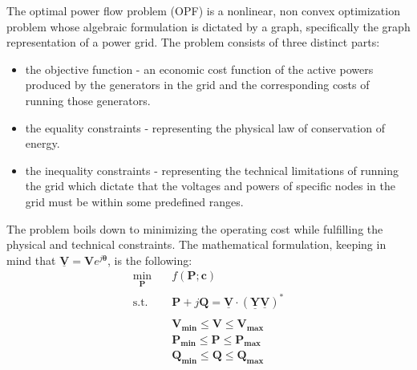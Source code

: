 The optimal power flow problem (OPF) is a nonlinear, non convex optimization problem\cite{cain2012history, bienstock2019strong} whose algebraic formulation is dictated by a graph,
specifically the graph representation of a power grid.
The problem consists of three distinct parts:

\begin{itemize}
    \item the objective function - an economic cost function of the active powers produced by the generators in
    the grid and the corresponding costs of running those generators.

    \item the equality constraints - representing the physical law of conservation of energy.

    \item the inequality constraints - representing the technical limitations of running the grid which dictate that
    the voltages and powers of specific nodes in the grid must be within some predefined ranges.
\end{itemize}

\noindent The problem boils down to minimizing the operating cost while fulfilling the physical and technical constraints.
The mathematical formulation, keeping in mind that $\boldsymbol{\underline{V}} = \boldsymbol{V}e^{j\boldsymbol{\theta}}$, is the following:
\begin{equation}
    \begin{aligned}
        \min_{\boldsymbol{P}} \quad & f(\boldsymbol{P}; \boldsymbol{c})\\%
        \textrm{s.t.} %
        \quad & \boldsymbol{P} + j\boldsymbol{Q} = \underline{\boldsymbol{V}} \cdot \left(\underline{\boldsymbol{Y}}\underline{\boldsymbol{V}}\right)^*\\ \\
        \quad & \boldsymbol{V_{min}} \leq \boldsymbol{V} \leq \boldsymbol{V_{max}} \\
        \quad & \boldsymbol{P_{min}} \leq \boldsymbol{P} \leq \boldsymbol{P_{max}} \\
        \quad & \boldsymbol{Q_{min}} \leq \boldsymbol{Q} \leq \boldsymbol{Q_{max}}
    \end{aligned}
\end{equation}

